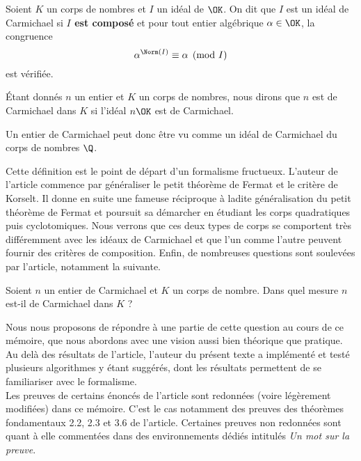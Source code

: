 \begin{definition} Soient $K$ un corps de nombres et $I$ un idéal de $\OK$. On dit que $I$ est un idéal de Carmichael si \textbf{$I$ est composé} et pour tout entier algébrique $\alpha \in \OK$, la congruence
	\begin{equation}\label{congruence-Carmichael}
		\alpha^{\Norm(I)} \equiv \alpha \pmod{I}
	\end{equation}
est vérifiée.
\end{definition}

Étant donnés $n$ un entier et $K$ un corps de nombres, nous dirons que $n$ est de Carmichael dans $K$ si l'idéal $n\OK$ est de Carmichael.

\begin{remarque}
	Un entier de Carmichael peut donc être vu comme un idéal de Carmichael du corps de nombres $\Q$.
\end{remarque}

Cette définition est le point de départ d'un formalisme fructueux. L'auteur de l'article commence par généraliser le petit théorème de Fermat et le critère de Korselt. Il donne en suite une fameuse réciproque à ladite généralisation du petit théorème de Fermat et poursuit sa démarcher en étudiant les corps quadratiques puis cyclotomiques. Nous verrons que ces deux types de corps se comportent très différemment avec les idéaux de Carmichael et que l'un comme l'autre peuvent fournir des critères de composition. Enfin, de nombreuses questions sont soulevées par l'article, notamment la suivante. \\

\begin{question}\label{question-centrale}Soient $n$ un entier de Carmichael et $K$ un corps de nombre. Dans quel mesure $n$ est-il de Carmichael dans $K$ ?
\end{question}

Nous nous proposons de répondre à une partie de cette question au cours de ce mémoire, que nous abordons avec une vision aussi bien théorique que pratique. Au delà des résultats de l'article, l'auteur du présent texte a implémenté et testé plusieurs algorithmes y étant suggérés, dont les résultats permettent de se familiariser avec le formalisme. \\

Les preuves de certains énoncés de l'article sont redonnées (voire légèrement modifiées) dans ce mémoire. C'est le cas notamment des preuves des théorèmes fondamentaux 2.2, 2.3 et 3.6 de l'article. Certaines preuves non redonnées sont quant à elle commentées dans des environnements dédiés intitulés \textit{Un mot sur la preuve}.
